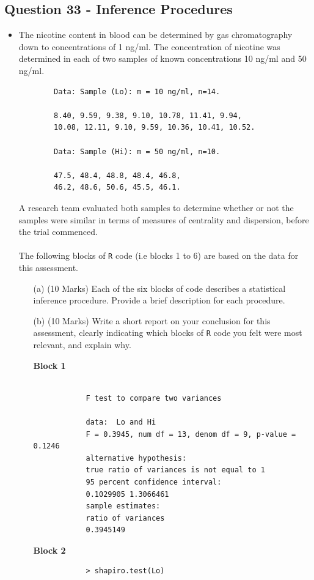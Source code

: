 \documentclass[a4paper,12pt]{article}
\begin{document}
\subsection*{Question 33 - Inference Procedures}
\begin{itemize}
	\item The nicotine content in blood can be determined by gas chromatography down to concentrations of 1 ng/ml. The concentration of nicotine was determined in each of two samples of known concentrations 10 ng/ml and 50 ng/ml.
	\begin{framed}
		\begin{verbatim}
		Data: Sample (Lo): m = 10 ng/ml, n=14.
		
		8.40, 9.59, 9.38, 9.10, 10.78, 11.41, 9.94, 
		10.08, 12.11, 9.10, 9.59, 10.36, 10.41, 10.52.
		
		Data: Sample (Hi): m = 50 ng/ml, n=10.
		
		47.5, 48.4, 48.8, 48.4, 46.8, 
		46.2, 48.6, 50.6, 45.5, 46.1.
		\end{verbatim}
	\end{framed}
	A research team evaluated both samples to determine whether or not the samples were similar in terms of measures of centrality and dispersion, before the trial commenced.  \\  \\ The following blocks of \texttt{R} code (i.e blocks 1 to 6) are based on the data for this assessment. \\ 
	\begin{itemize}
		\item[(a)] (10 Marks) Each of the six blocks of code describes a statistical inference procedure. Provide a brief description for each procedure.
		\item[(b)] (10 Marks) Write a short report on your conclusion for this assessment, clearly indicating which blocks of \texttt{R} code you felt were most relevant, and explain why. 
	\end{itemize}
	
	\begin{itemize}
		\item[\textbf{Block 1}]
		\begin{framed}
			\begin{verbatim}
			
			F test to compare two variances
			
			data:  Lo and Hi
			F = 0.3945, num df = 13, denom df = 9, p-value = 0.1246
			alternative hypothesis: 
			true ratio of variances is not equal to 1
			95 percent confidence interval:
			0.1029905 1.3066461
			sample estimates:
			ratio of variances 
			0.3945149
			\end{verbatim}
		\end{framed}
		\newpage
		\item[\textbf{Block 2}]
		\begin{framed}
			\begin{verbatim}
			> shapiro.test(Lo)
			

\end{verbatim}
\end{framed}
\end{itemize}
\end{itemize}
\end{document}
